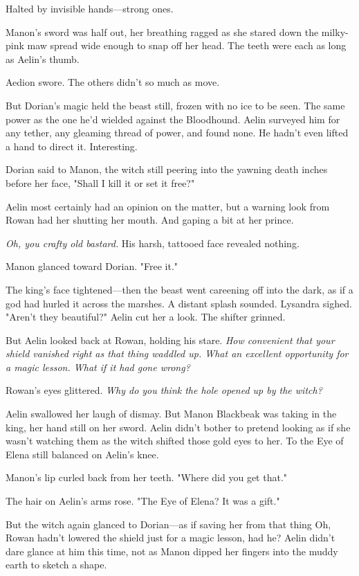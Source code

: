 Halted by invisible hands---strong ones.

Manon's sword was half out, her breathing ragged as she stared down the milky-pink maw spread wide enough to snap off her head. The teeth were each as long as Aelin's thumb.

Aedion swore. The others didn't so much as move.

But Dorian's magic held the beast still, frozen with no ice to be seen. The same power as the one he'd wielded against the Bloodhound. Aelin surveyed him for any tether, any gleaming thread of power, and found none. He hadn't even lifted a hand to direct it. Interesting.

Dorian said to Manon, the witch still peering into the yawning death inches before her face, "Shall I kill it or set it free?"

Aelin most certainly had an opinion on the matter, but a warning look from Rowan had her shutting her mouth. And gaping a bit at her prince.

\emph{Oh, you crafty old bastard.} His harsh, tattooed face revealed nothing.

Manon glanced toward Dorian. "Free it."

The king's face tightened---then the beast went careening off into the dark, as if a god had hurled it across the marshes. A distant splash sounded. Lysandra sighed. "Aren't they beautiful?" Aelin cut her a look. The shifter grinned.

But Aelin looked back at Rowan, holding his stare. \emph{How convenient that your shield vanished right as that thing waddled up. What an excellent opportunity for a magic lesson. What if it had gone wrong?}

Rowan's eyes glittered. \emph{Why do you think the hole opened up by the witch?}

Aelin swallowed her laugh of dismay. But Manon Blackbeak was taking in the king, her hand still on her sword. Aelin didn't bother to pretend looking as if she wasn't watching them as the witch shifted those gold eyes to her. To the Eye of Elena still balanced on Aelin's knee.

Manon's lip curled back from her teeth. "Where did you get that."

The hair on Aelin's arms rose. "The Eye of Elena? It was a gift."

But the witch again glanced to Dorian---as if saving her from that thing
 Oh, Rowan hadn't lowered the shield just for a magic lesson, had he? Aelin didn't dare glance at him this time, not as Manon dipped her fingers into the muddy earth to sketch a shape.


